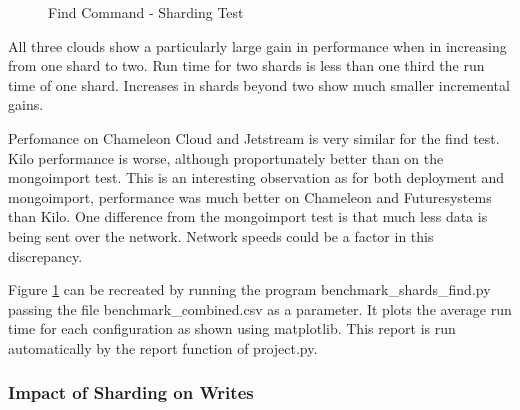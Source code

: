 \documentclass[sigconf]{acmart}
\begin{document}
\begin{figure}[htbp]
\centering
{}
\caption{Find Command - Sharding Test}
\label{fig:shard-find}
\end{figure}


All three clouds show a particularly large gain in performance when in increasing from one shard to two.  Run time for two shards is less than one third the run time of one shard.  Increases in shards beyond two show much smaller incremental gains.

Perfomance on Chameleon Cloud and Jetstream is very similar for the find test.  Kilo performance is worse, although proportunately better than on the mongoimport test.  This is an interesting observation as for both deployment and mongoimport, performance was much better on Chameleon and Futuresystems than Kilo.  One difference from the mongoimport test is that much less data is being sent over the network.  Network speeds could be a factor in this discrepancy.

Figure \ref{fig:shard-find} can be recreated by running the program benchmark\_shards\_find.py passing the file benchmark\_combined.csv as a parameter.  It plots the average run time for each configuration as shown using matplotlib.  This report is run automatically by the report function of project.py.




\subsubsection{Impact of Sharding on Writes}
\end{document}
